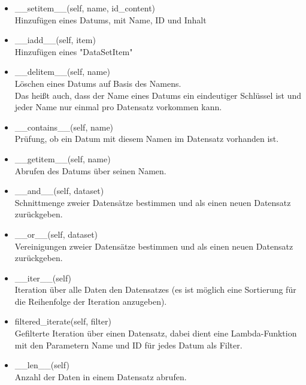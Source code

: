 \documentclass[]{article}
\begin{document}
\begin{itemize}
    \item \_\_setitem\_\_(self, name, id\_content)\\
Hinzufügen eines Datums, mit Name, ID und Inhalt\\
    \item \_\_iadd\_\_(self, item)\\
Hinzufügen eines "DataSetItem"\\
    \item \_\_delitem\_\_(self, name)\\
Löschen eines Datums auf Basis des Namens.\\
Das heißt auch, dass der Name eines Datums ein eindeutiger Schlüssel ist und jeder Name nur einmal pro Datensatz vorkommen kann.\\
    \item \_\_contains\_\_(self, name)\\
Prüfung, ob ein Datum mit diesem Namen im Datensatz vorhanden ist.\\
    \item \_\_getitem\_\_(self, name)\\
Abrufen des Datums über seinen Namen.\\ 
    \item \_\_and\_\_(self, dataset)\\
Schnittmenge zweier Datensätze bestimmen und als einen neuen Datensatz zurückgeben.\\
    \item \_\_or\_\_(self, dataset)\\
Vereinigungen zweier Datensätze bestimmen und als einen neuen Datensatz zurückgeben.\\
    \item \_\_iter\_\_(self)\\
Iteration über alle Daten den Datensatzes (es ist möglich eine Sortierung für die Reihenfolge der Iteration anzugeben).\\ 
    \item filtered\_iterate(self, filter)\\
Gefilterte Iteration über einen Datensatz, dabei dient eine Lambda-Funktion mit den Parametern Name und ID für jedes Datum als Filter.\\
    \item \_\_len\_\_(self)\\
Anzahl der Daten in einem Datensatz abrufen.\\
\\
\end{itemize}
\end{document}
